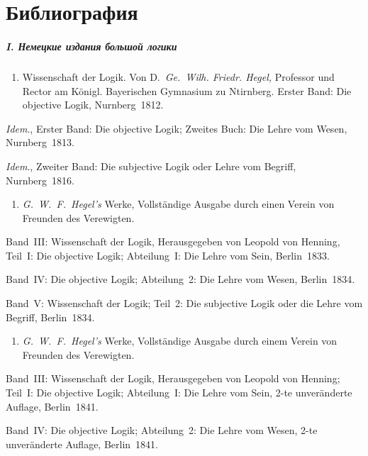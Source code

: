 \bigskip
\clearpage

\chapter[Библиография]{Библиография}

\paragraph%
[I. Немецкие издания большой логики]%
{I. Немецкие издания большой логики}

\begin{enumerate}
\item
Wissen\-schaft der Logik. Von D.~{\em Ge.~Wilh. Friedr. Hegel,}
Professor und Rector am Königl. Bayeri\-schen Gymnasium zu Ntirnberg.
Erster Band: Die objective Logik, Nurnberg~1812.
\end{enumerate}

{\em Idem}., Erster Band: Die objective Logik; Zweites Buch: Die Lehre
vom Wesen, Nurnberg~1813.

{\em Idem}., Zweiter Band: Die subjective Logik oder Lehre vom Begriff,
Nurnberg~1816.

\begin{enumerate}
\item
{\em G.~W.~F.~Hegel's} Werke, Vollstän\-dige Ausgabe durch einen Verein von
Freunden des Verewigten.
\end{enumerate}

Band~III: Wissen\-schaft der Logik, Heraus\-gegeben von
Leopold von Henning, Teil~I: Die objective Logik; Abteilung~I: Die Lehre
vom Sein, Berlin~1833.

Band~IV: Die objective Logik; Abteilung~2: Die Lehre vom Wesen, Berlin~1834.

Band~V: Wissen\-schaft der Logik; Teil~2: Die subjective Logik oder die Lehre
vom Begriff, Berlin~1834.

\begin{enumerate}
\item
{\em G.~W.~F.~Hegel's} Werke, Voll\-ständige Ausgabe durch einem Verein von
Freunden des Verewigten.
\end{enumerate}

Band~III: Wissen\-schaft der Logik, Heraus\-gegeben von Leopold von Henning;
Teil~I: Die objective Logik; Abteilung~I: Die Lehre vom Sein, 2-te
unver\-änderte Auflage, Berlin~1841.

Band~IV: Die objective Logik; Abteilung~2: Die Lehre vom Wesen, 2-te
unver\-änderte Auflage, Berlin~1841.


